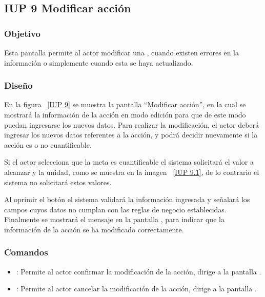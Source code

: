 \subsection{IUP 9 Modificar acción}

\subsubsection{Objetivo}
   
   Esta pantalla permite al actor modificar una , cuando existen errores en la información o simplemente cuando esta se haya actualizado.

	
\subsubsection{Diseño}

  En la figura ~\ref{IUP 9} se muestra la pantalla ``Modificar acción'', en la cual se mostrará la información de la acción en modo edición para que
  de este modo puedan ingresarse los nuevos datos.
  Para realizar la modificación, el actor deberá ingresar los nuevos datos referentes a la acción, y podrá decidir nuevamente si la acción es o no cuantificable.\\
  


  Si el actor selecciona que la meta es cuantificable el sistema solicitará  el valor a alcanzar y la unidad, como se muestra en la imagen ~\ref{IUP 9.1}, de lo contrario
  el sistema no solicitará estos valores.
    
   
  Al oprimir el botón  el sistema validará la información ingresada y señalará los campos cuyos datos no cumplan con las reglas de negocio establecidas.\\
  
  Finalmente se mostrará el mensaje  en la pantalla , para indicar que la información de la acción
  se ha modificado correctamente.
    
\subsubsection{Comandos}
\begin{itemize}
	\item {}: Permite al actor confirmar la modificación de la acción, dirige a la pantalla .
	\item {}: Permite al actor cancelar la modificación de la acción, dirige a la pantalla .
\end{itemize}


